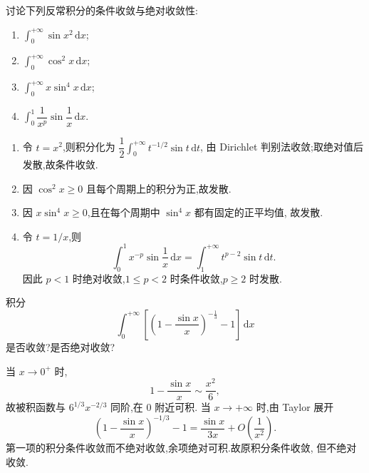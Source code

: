 \begin{example}
  讨论下列反常积分的条件收敛与绝对收敛性:
  \begin{enumerate}
    \item $\displaystyle\int_0^{+\infty}\sin x^2\,\mathrm{d}x$;
    \item $\displaystyle\int_0^{+\infty}\cos^2x\,\mathrm{d}x$;
    \item $\displaystyle\int_0^{+\infty}x\sin^4x\,\mathrm{d}x$;
    \item $\displaystyle\int_0^1\dfrac{1}{x^p}\sin\dfrac{1}{x}\,\mathrm{d}x$.
  \end{enumerate}
\end{example}
\exampleblank

\begin{solution}
  \leavevmode
  \begin{enumerate}
    \item 令 $t=x^2$,则积分化为
          $\dfrac{1}{2}\displaystyle\int_0^{+\infty}t^{-1/2}\sin t\,\mathrm{d}t$,
          由 Dirichlet 判别法收敛;取绝对值后发散,故条件收敛.
    \item 因 $\cos^2x\geq0$ 且每个周期上的积分为正,故发散.
    \item 因 $x\sin^4x\geq0$,且在每个周期中 $\sin^4x$ 都有固定的正平均值,
          故发散.
    \item 令 $t=1/x$,则
          \[
            \displaystyle\int_0^1x^{-p}\sin\dfrac{1}{x}\,\mathrm{d}x
            =\int_1^{+\infty}t^{p-2}\sin t\,\mathrm{d}t.
          \]
          因此 $p<1$ 时绝对收敛,$1\leq p<2$ 时条件收敛,$p\geq2$ 时发散.
  \end{enumerate}
\end{solution}

\begin{example}
  积分
  \[
    \displaystyle\int_0^{+\infty}\left[\left(1-\dfrac{\sin x}{x}\right)^{-\frac{1}{3}}-1\right]\,\mathrm{d}x
  \]
  是否收敛?是否绝对收敛?
\end{example}
\exampleblank

\begin{solution}
  当 $x\to0^+$ 时,
  \[
    1-\dfrac{\sin x}{x}\sim\dfrac{x^2}{6},
  \]
  故被积函数与 $6^{1/3}x^{-2/3}$ 同阶,在 $0$ 附近可积.
  当 $x\to+\infty$ 时,由 Taylor 展开
  \[
    \left(1-\dfrac{\sin x}{x}\right)^{-1/3}-1
    =\dfrac{\sin x}{3x}+O\left(\dfrac{1}{x^2}\right).
  \]
  第一项的积分条件收敛而不绝对收敛,余项绝对可积.故原积分条件收敛,
  但不绝对收敛.
\end{solution}

